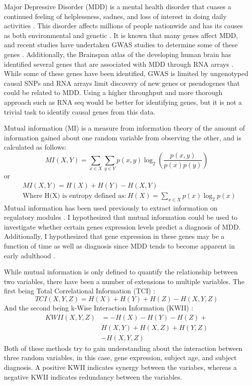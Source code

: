 \documentclass{bioinfo}
\begin{document}
Major Depressive Disorder (MDD) is a mental health disorder that cuases a continued feeling of helplessness, sadnes, and loss of interest in doing daily activities \citep{Mayo}. This disorder affects millions of people nationwide and has its causes as both environmental and genetic \citep{Brainspan}.  It is known that many genes affect MDD, and recent studies have undertaken GWAS studies to determine some of these genes \citep{Cai, Malhotra}. Additionally, the Brainspan atlas of the developing
human brain has identified several genes that are associated with MDD through RNA arrays \citep{Brainspan}. While some of these genes have been identified, GWAS is limited by ungenotyped causal SNPs and RNA arrays limit discovery of new genes or pseudogenes that could be related to MDD.  Using a higher throughput and more thorough approach such as RNA seq would be better for identifying genes, but it is not a trivial task to identify causal genes from this data.

Mutual information (MI) is a measure from information theory of the amount of information gained about one random variable from observing the other, and is calculated as follows:
\begin{equation}
    MI(X,Y) = \sum_{x \in X} \sum_{y \in Y} p(x,y) \log_2 \left(\frac{p(x,y)}{p(x) p(y)}\right)
\end{equation}
or 
\begin{align}
    &MI(X,Y) = H(X) + H(Y) - H(X,Y) \\
    &\text{Where H(X) is entropy defined as:} \ H(X) = \sum_{x \in X} p(x) \log_2 p(x)
\end{align}
Mutual information has been used previously to extract information on regulatory modules \citep{Elemento}.  I hypothesized that mutual information could be used to investigate whether certain genes expression levels predict a diagnosis of MDD.  Additionally, I hypothesized that gene expression in these genes may be a function of time as well as diagnosis since MDD tends to become apparent in early adulthood \citep{Mayo}.  

While mutual information is only defined to quantify the relationship between two variables, there have been a number of extensions to multiple variables.  The first being Total Correlational Information (TCI) \citep{Timme, Watkinson}:
\begin{equation}
    TCI(X,Y,Z) = H(X) + H(Y) + H(Z) - H(X,Y,Z)
\end{equation}
And the second being k-Wise Interaction Information (KWII) \citep{Timme}:
\begin{equation}
    \begin{split}
        KWII(X,Y,Z) &= - H(X) - H(Y) - H(Z) + \\
                    &H(X,Y) + H(X,Z) + H(Y,Z) \\
                    &- H(X,Y,Z)
    \end{split}
\end{equation}
Both of these methods try to gain understanding about the interaction between three random variables, in this case, gene expression, subject age, and subject diagnosis.  A positive KWII indicates synergy between the variabes, whereas a negative KWII indicates redundancy between the variables.
\end{document}
